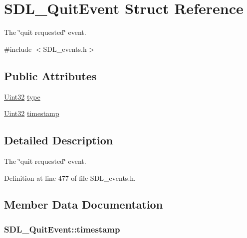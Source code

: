 \hypertarget{struct_s_d_l___quit_event}{\section{S\-D\-L\-\_\-\-Quit\-Event Struct Reference}
\label{struct_s_d_l___quit_event}
}


The \char`\"{}quit requested\char`\"{} event.  




{\ttfamily \#include $<$S\-D\-L\-\_\-events.\-h$>$}

\subsection*{Public Attributes}
\begin{DoxyCompactItemize}
\item 
\hyperlink{_s_d_l__stdinc_8h_add440eff171ea5f55cb00c4a9ab8672d}{Uint32} \hyperlink{struct_s_d_l___quit_event_a51ab0279e6de40249ba93971a8757cf0}{type}
\item 
\hyperlink{_s_d_l__stdinc_8h_add440eff171ea5f55cb00c4a9ab8672d}{Uint32} \hyperlink{struct_s_d_l___quit_event_a7acd4fa42ca96da8edac146baaa0b433}{timestamp}
\end{DoxyCompactItemize}


\subsection{Detailed Description}
The \char`\"{}quit requested\char`\"{} event. 

Definition at line 477 of file S\-D\-L\-\_\-events.\-h.



\subsection{Member Data Documentation}
\hypertarget{struct_s_d_l___quit_event_a7acd4fa42ca96da8edac146baaa0b433}{
\subsubsection[{timestamp}]{ S\-D\-L\-\_\-\-Quit\-Event\-::timestamp}}\label{struct_s_d_l___quit_event_a7acd4fa42ca96da8edac146baaa0b433}


